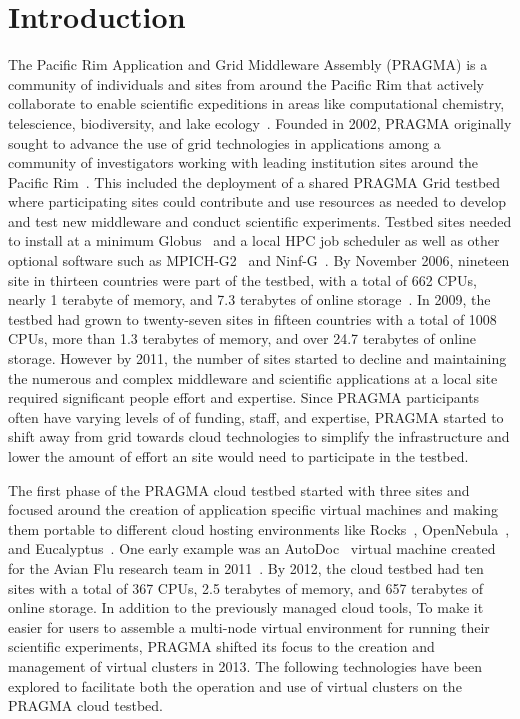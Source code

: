 \documentclass{acm_proc_article-sp}
\begin{document}


\section{Introduction}

The Pacific Rim Application and Grid Middleware Assembly (PRAGMA) is a community of individuals and sites from around the Pacific Rim that actively collaborate to enable scientific expeditions in areas like computational chemistry, telescience, biodiversity, and lake ecology~\cite{pragmaWeb}.  Founded in 2002, PRAGMA originally sought to advance the use of grid technologies in applications among a community of investigators working with leading institution sites around the Pacific Rim~\cite{pragmaReport2004}.  This included the deployment of a shared PRAGMA Grid testbed where participating sites could contribute and use resources as needed to develop and test new middleware and conduct scientific experiments.  Testbed sites needed to install at a minimum Globus~\cite{globus} and a local HPC job scheduler as well as other optional software such as MPICH-G2~\cite{mpichg2} and Ninf-G~\cite{ninfg}.  By November 2006, nineteen site in thirteen countries were part of the testbed, with a total of 662 CPUs, nearly 1 terabyte of memory, and 7.3 terabytes of online storage~\cite{pragmaReport2006}.  In 2009, the testbed had grown to twenty-seven sites in fifteen countries with a total of 1008 CPUs, more than 1.3 terabytes of memory, and over 24.7 terabytes of online storage.  However by 2011, the number of sites started to decline and maintaining the numerous and complex middleware and scientific applications at a local site required significant people effort and expertise.  Since PRAGMA participants often have varying levels of of funding, staff, and expertise, PRAGMA started to shift away from grid towards cloud technologies to simplify the infrastructure and lower the amount of effort an site would need to participate in the testbed.  

The first phase of the PRAGMA cloud testbed started with three sites and focused around the creation of application specific virtual machines and making them portable to  different cloud hosting environments like Rocks~\cite{rocks}, OpenNebula~\cite{opennebula}, and Eucalyptus~\cite{eucalyptus}.
One early example was an AutoDoc~\cite{autodock} virtual machine created for the Avian Flu research team in 2011~\cite{pragmaReport2011}.   By 2012, the cloud testbed had ten sites with a total of 367 CPUs, 2.5 terabytes of memory, and 657 terabytes of online storage.  In addition to the previously managed cloud tools, To make it easier for users to assemble a multi-node virtual environment for running their scientific experiments, PRAGMA shifted its  focus to the creation and management of virtual clusters in 2013.  The following technologies have been explored to facilitate both the operation and use of virtual clusters on the PRAGMA cloud testbed.
\end{document}

